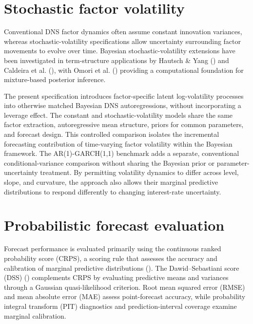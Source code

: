 \documentclass[
  12pt,
  letterpaper,
  DIV=11,
  numbers=noendperiod]{scrreprt}
\begin{document}
\section{Stochastic factor
volatility}\label{stochastic-factor-volatility}

Conventional DNS factor dynamics often assume constant innovation
variances, whereas stochastic-volatility specifications allow
uncertainty surrounding factor movements to evolve over time. Bayesian
stochastic-volatility extensions have been investigated in
term-structure applications by Hautsch \& Yang
() and Caldeira et al.
(), with Omori et al.
() providing a computational
foundation for mixture-based posterior inference.

The present specification introduces factor-specific latent
log-volatility processes into otherwise matched Bayesian DNS
autoregressions, without incorporating a leverage effect. The constant
and stochastic-volatility models share the same factor extraction,
autoregressive mean structure, priors for common parameters, and
forecast design. This controlled comparison isolates the incremental
forecasting contribution of time-varying factor volatility within the
Bayesian framework. The AR(1)-GARCH(1,1) benchmark adds a separate,
conventional conditional-variance comparison without sharing the
Bayesian prior or parameter-uncertainty treatment. By permitting
volatility dynamics to differ across level, slope, and curvature, the
approach also allows their marginal predictive distributions to respond
differently to changing interest-rate uncertainty.

\section{Probabilistic forecast
evaluation}\label{probabilistic-forecast-evaluation}

Forecast performance is evaluated primarily using the continuous ranked
probability score (CRPS), a scoring rule that assesses the accuracy and
calibration of marginal predictive distributions
(). The
Dawid--Sebastiani score (DSS) () complements CRPS by evaluating predictive means and
variances through a Gaussian quasi-likelihood criterion. Root mean
squared error (RMSE) and mean absolute error (MAE) assess point-forecast
accuracy, while probability integral transform (PIT) diagnostics and
prediction-interval coverage examine marginal calibration.
\end{document}
